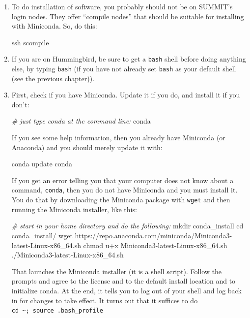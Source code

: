 \documentclass[]{krantz}
\makeatletter
\newenvironment{Shaded}{\begin{snugshade}}{\end{snugshade}}
\newcommand{\BuiltInTok}[1]{#1}
\newcommand{\CommentTok}[1]{\textcolor[rgb]{0.37,0.37,0.37}{\textit{#1}}}
\newcommand{\ExtensionTok}[1]{#1}
\newcommand{\FunctionTok}[1]{\textcolor[rgb]{0,0,0}{#1}}
\newcommand{\NormalTok}[1]{#1}
\newenvironment{kframe}{%
\medskip{}
\setlength{\fboxsep}{.8em}
 \def\at@end@of@kframe{}%
 \ifinner\ifhmode%
  \def\at@end@of@kframe{\end{minipage}}%
  \begin{minipage}{\columnwidth}%
 \fi\fi%
 \def\FrameCommand##1{\hskip\@totalleftmargin \hskip-\fboxsep
 \colorbox{shadecolor}{##1}\hskip-\fboxsep
     \hskip-\linewidth \hskip-\@totalleftmargin \hskip\columnwidth}%
 \MakeFramed {\advance\hsize-\width
   \@totalleftmargin\z@ \linewidth\hsize
   \@setminipage}}%
 {\par\unskip\endMakeFramed%
 \at@end@of@kframe}
\renewenvironment{Shaded}{\begin{kframe}}{\end{kframe}}
\makeatother
\begin{document}
\begin{enumerate}
\def\labelenumi{\arabic{enumi}.}
\item
  To do installation of software, you probably should not be on SUMMIT's login nodes.
  They offer ``compile nodes'' that should be suitable for installing with Miniconda. So, do this:

\begin{Shaded}
\begin{Highlighting}[]
\FunctionTok{ssh}\NormalTok{ scompile}
\end{Highlighting}
\end{Shaded}
\item
  If you are on Hummingbird, be sure to get a \texttt{bash} shell before doing anything else, by typing \texttt{bash}
  (if you have not already set \texttt{bash} as your default shell (see the previous chapter)).
\item
  First, check if you have Miniconda. Update it if you do, and install it if you don't:

\begin{Shaded}
\begin{Highlighting}[]
\CommentTok{# just type conda at the command line:}
\ExtensionTok{conda}
\end{Highlighting}
\end{Shaded}

  If you see some help information, then you already have Miniconda (or Anaconda) and you
  should merely update it with:

\begin{Shaded}
\begin{Highlighting}[]
\ExtensionTok{conda}\NormalTok{ update conda}
\end{Highlighting}
\end{Shaded}

  If you get an error telling you that your computer does not know about a command, \texttt{conda}, then
  you do not have Miniconda and you must install it. You do that by downloading the Miniconda package
  with \texttt{wget} and then running the Miniconda installer, like this:

\begin{Shaded}
\begin{Highlighting}[]
\CommentTok{# start in your home directory and do the following:}
\FunctionTok{mkdir}\NormalTok{ conda_install}
\BuiltInTok{cd}\NormalTok{ conda_install/}
\FunctionTok{wget}\NormalTok{ https://repo.anaconda.com/miniconda/Miniconda3-latest-Linux-x86_64.sh}
\FunctionTok{chmod}\NormalTok{ u+x Miniconda3-latest-Linux-x86_64.sh }
\ExtensionTok{./Miniconda3-latest-Linux-x86_64.sh} 
\end{Highlighting}
\end{Shaded}

  That launches the Miniconda installer (it is a shell script). Follow the prompts and agree
  to the license and to the default install location and to initialize conda.
  At the end, it tells you to log out of your shell and log back in for changes to take
  effect. It turns out that it suffices to do \texttt{cd\ \textasciitilde{};\ source\ .bash\_profile}
\end{enumerate}
\end{document}
